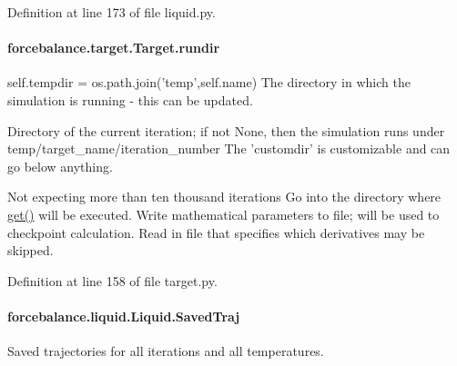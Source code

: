 Definition at line 173 of file liquid.\-py.

\hypertarget{classforcebalance_1_1target_1_1Target_a6872de5b2d4273b82336ea5b0da29c9e}{
\paragraph[{rundir}]{\setlength{\rightskip}{0pt plus 5cm}forcebalance.\-target.\-Target.\-rundir\hspace{0.3cm}{\ttfamily [inherited]}}}\label{classforcebalance_1_1target_1_1Target_a6872de5b2d4273b82336ea5b0da29c9e}


self.\-tempdir = os.\-path.\-join('temp',self.\-name) The directory in which the simulation is running -\/ this can be updated. 

Directory of the current iteration; if not None, then the simulation runs under temp/target\-\_\-name/iteration\-\_\-number The 'customdir' is customizable and can go below anything.

Not expecting more than ten thousand iterations Go into the directory where \hyperlink{classforcebalance_1_1target_1_1Target_a1389888302c49d529716cb45b13a6f5a}{get()} will be executed. Write mathematical parameters to file; will be used to checkpoint calculation. Read in file that specifies which derivatives may be skipped. 

Definition at line 158 of file target.\-py.

\hypertarget{classforcebalance_1_1liquid_1_1Liquid_a0da0c00cdc193c9c470d7e528043fb99}{
\paragraph[{Saved\-Traj}]{\setlength{\rightskip}{0pt plus 5cm}forcebalance.\-liquid.\-Liquid.\-Saved\-Traj\hspace{0.3cm}{\ttfamily [inherited]}}}\label{classforcebalance_1_1liquid_1_1Liquid_a0da0c00cdc193c9c470d7e528043fb99}


Saved trajectories for all iterations and all temperatures. 



